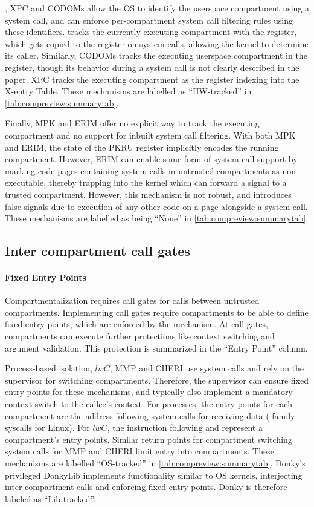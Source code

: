 \seccells, XPC and CODOMs allow the OS to identify the userspace compartment 
using a system call, and can enforce per-compartment system call filtering 
rules using these identifiers.
\seccells tracks the currently executing compartment with the  \sid register,
which gets copied to the \rid register on system calls, allowing the kernel to
determine its caller.
Similarly, CODOMs tracks the executing userspace compartment in the 
 register, though its behavior during a system call is not
clearly described in the paper.
XPC tracks the executing compartment as the register 
indexing into the X-entry Table.
These mechanisms are labelled as ``HW-tracked'' in 
\autoref{tab:compreview:summarytab}.

Finally, MPK and ERIM offer no explicit way to track the executing compartment
and no support for inbuilt system call filtering.
With both MPK and ERIM, the state of the PKRU register implicitly encodes the
running compartment.
However, ERIM can enable some form of system call support by marking code pages 
containing system calls in untrusted compartments as non-executable, thereby
trapping into the kernel which can forward a signal to a trusted compartment.
However, this mechanism is not robust, and introduces false signals due
to execution of any other code on a page alongside a system call.
These mechanisms are labelled as being ``None'' in 
\autoref{tab:compreview:summarytab}.

\subsection{Inter compartment call gates}
\paragraph{Fixed Entry Points}
Compartmentalization requires call gates for calls between untrusted 
compartments.
Implementing call gates require compartments to be able to define
fixed entry points, which are enforced by the mechanism.
At call gates, compartments can execute further protections
like context switching and argument validation.
This protection is summarized in the ``Entry Point'' column.

Process-based isolation, $lwC$, MMP and CHERI use system calls
and rely on the supervisor for switching compartments.
Therefore, the supervisor can ensure fixed entry points for these
mechanisms, and typically also implement a mandatory context switch
to the callee's context.
For processes, the entry points for each compartment are the 
address following system calls for receiving data 
(-family syscalls for Linux).
For $lwC$, the instruction following  and 
represent a compartment's entry points.
Similar return points for compartment switching system calls for MMP
and CHERI limit entry into compartments.
These mechanisms are labelled ``OS-tracked'' in 
\autoref{tab:compreview:summarytab}.
Donky's privileged DonkyLib implements functionality similar to OS kernels, 
interjecting inter-compartment calls and enforcing fixed entry points.
Donky is therefore labeled as ``Lib-tracked''.

